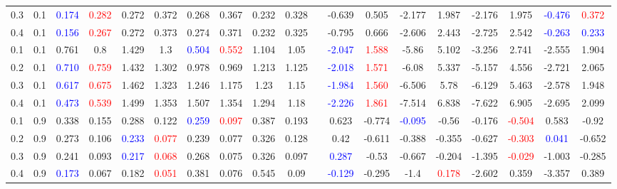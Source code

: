 \documentclass[specialist,
substylefile = spbu_report.rtx,
subf,href,colorlinks=true, 12pt]{disser}
\theoremstyle{definition}
\begin{document}
\begin{table}
{\begin{tabular}{m{1cm}m{1cm}ccccccccm{0.2cm}cccccccc}
            0.3 & 0.1 & \textcolor{blue}{0.174} & \textcolor{red}{0.282} & 0.272 & 0.372 & 0.268 & 0.367 & 0.232 & 0.328 & & -0.639 & 0.505 & -2.177 & 1.987 & -2.176 & 1.975 & \textcolor{blue}{-0.476} & \textcolor{red}{0.372} \\ 
            0.4 & 0.1 & \textcolor{blue}{0.156} & \textcolor{red}{0.267} & 0.272 & 0.373 & 0.274 & 0.371 & 0.232 & 0.325 & & -0.795 & 0.666 & -2.606 & 2.443 & -2.725 & 2.542 & \textcolor{blue}{-0.263} & \textcolor{blue}{0.233} \\ 
			\hline
			0.1 & 0.1 & 0.761 & 0.8 & 1.429 & 1.3 & \textcolor{blue}{0.504} & \textcolor{red}{0.552} & 1.104 & 1.05 & & \textcolor{blue}{-2.047} & \textcolor{red}{1.588} & -5.86 & 5.102 & -3.256 & 2.741 & -2.555 & 1.904 \\ 
			0.2 & 0.1 & \textcolor{blue}{0.710} & \textcolor{red}{0.759} & 1.432 & 1.302 & 0.978 & 0.969 & 1.213 & 1.125 & & \textcolor{blue}{-2.018} & \textcolor{red}{1.571} & -6.08 & 5.337 & -5.157 & 4.556 & -2.721 & 2.065 \\ 
			0.3 & 0.1 & \textcolor{blue}{0.617} & \textcolor{red}{0.675} & 1.462 & 1.323 & 1.246 & 1.175 & 1.23 & 1.15 & & \textcolor{blue}{-1.984} & \textcolor{red}{1.560} & -6.506 & 5.78 & -6.129 & 5.463 & -2.578 & 1.948 \\ 
			0.4 & 0.1 & \textcolor{blue}{0.473} & \textcolor{red}{0.539} & 1.499 & 1.353 & 1.507 & 1.354 & 1.294 & 1.18 & & \textcolor{blue}{-2.226} & \textcolor{red}{1.861} & -7.514 & 6.838 & -7.622 & 6.905 & -2.695 & 2.099 \\ 
			\hline
			0.1 & 0.9 & 0.338 & 0.155 & 0.288 & 0.122 & \textcolor{blue}{0.259} & \textcolor{red}{0.097} & 0.387 & 0.193 & & 0.623 & -0.774 & \textcolor{blue}{-0.095} & -0.56 & -0.176 & \textcolor{red}{-0.504} & 0.583 & -0.92 \\ 
			0.2 & 0.9 & 0.273 & 0.106 & \textcolor{blue}{0.233} & \textcolor{red}{0.077} & 0.239 & 0.077 & 0.326 & 0.128 & & 0.42 & -0.611 & -0.388 & -0.355 & -0.627 & \textcolor{red}{-0.303} & \textcolor{blue}{0.041} & -0.652 \\ 
			0.3 & 0.9 & 0.241 & 0.093 & \textcolor{blue}{0.217} & \textcolor{red}{0.068} & 0.268 & 0.075 & 0.326 & 0.097 & & \textcolor{blue}{0.287} & -0.53 & -0.667 & -0.204 & -1.395 & \textcolor{red}{-0.029} & -1.003 & -0.285 \\ 
			0.4 & 0.9 & \textcolor{blue}{0.173} & 0.067 & 0.182 & \textcolor{red}{0.051} & 0.381 & 0.076 & 0.545 & 0.09 & & \textcolor{blue}{-0.129} & -0.295 & -1.4 & \textcolor{red}{0.178} & -2.602 & 0.359 & -3.357 & 0.389 \\ 
			\hline
		\end{tabular}
	}
\end{table}
\end{document}

